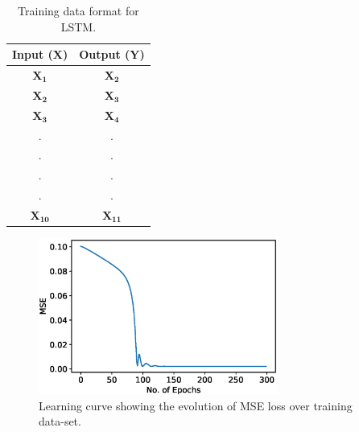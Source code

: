 \begin{table}
\begin{center}
\begin{tabular}{|c|c|}
\hline
Input (\begin{math}\boldsymbol{X}\end{math})&Output (\begin{math}\boldsymbol{Y}\end{math}) \\
\hline
\begin{math}\boldsymbol{X_1}\end{math}& \begin{math}\boldsymbol{X_2}\end{math} \\
\begin{math}\boldsymbol{X_2}\end{math}& \begin{math}\boldsymbol{X_3}\end{math}  \\
\begin{math}\boldsymbol{X_3}\end{math}& \begin{math}\boldsymbol{X_4}\end{math} \\
. & . \\
. & . \\
. & . \\
. & . \\
\begin{math}\boldsymbol{X_{10}}\end{math}& \begin{math}\boldsymbol{X_{11}}\end{math} \\
\hline
\end{tabular}
\end{center}
\caption{\label{tab:lstm-data-table}Training data format for LSTM.}
\end{table}

\begin{figure}[!h]
	\centering
	\includegraphics[width=0.7\textwidth]{Pictures/lstm-res/lstm-tanh_loss.eps}
	\hspace{1mm}
	\caption{Learning curve showing the evolution of MSE loss over training data-set.} 
	\label{fig:ann-training}
\end{figure}


